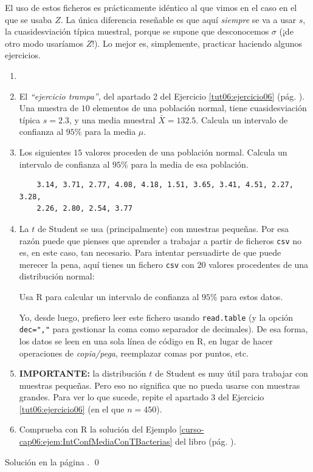 \documentclass[10pt,a4paper]{article}\usepackage[]{graphicx}\usepackage[]{color}
\begin{document}
El uso de estos ficheros es prácticamente idéntico al que vimos en el caso en el que se usaba $Z$. La  única diferencia reseñable es que aquí {\em siempre} se va a usar $s$, la cuasidesviación típica muestral, porque se supone que desconocemos $\sigma$ (¡de otro modo usaríamos $Z$!). Lo mejor es, simplemente, practicar haciendo algunos ejercicios.

\begin{ejercicio}
\label{tut06:ejercicio14}
\begin{enumerate}
  \item[]
  \item El {\em ``ejercicio trampa''}, del apartado 2 del Ejercicio \ref{tut06:ejercicio06} (pág. \pageref{tut06:ejercicio06}). Una muestra de $10$ elementos de una población normal, tiene cuasidesviación típica $s=2.3$, y una media muestral $\bar X=132.5$. Calcula un intervalo  de confianza al $95\%$ para la media $\mu$.

  \item Los siguientes $15$ valores proceden de una población normal. Calcula un intervalo de confianza al $95\%$ para la media de esa población.
    \begin{verbatim}
    3.14, 3.71, 2.77, 4.08, 4.18, 1.51, 3.65, 3.41, 4.51, 2.27, 3.28,
    2.26, 2.80, 2.54, 3.77
    \end{verbatim}

  \item La $t$ de Student se usa (principalmente) con muestras pequeñas. Por esa razón puede que pienses que aprender a trabajar a partir de ficheros {\tt csv} no es, en este caso, tan necesario.  Para intentar persuadirte de que puede merecer la pena, aquí tienes un fichero {\tt csv} con $20$ valores procedentes de una distribución normal:
      \begin{center}
      \end{center}
      Usa R para calcular un intervalo de confianza al $95\%$ para estos datos.

Yo, desde luego, prefiero leer este fichero usando {\tt read.table} (y la opción \verb/dec=","/ para gestionar la coma como separador de decimales). De esa forma, los datos se leen en una sola línea de código en R, en lugar de hacer operaciones de {\em copia/pega}, reemplazar comas por puntos, etc.

  \item {\bf IMPORTANTE:} la distribución $t$ de Student es muy útil para trabajar con muestras pequeñas. Pero eso no significa que no pueda usarse con muestras grandes. Para ver lo que sucede, repite el apartado 3 del Ejercicio \ref{tut06:ejercicio06} (en el que $n=450$).

  \item Comprueba con R la solución del Ejemplo \ref{curso-cap06:ejem:IntConfMediaConTBacterias} del libro (pág. \pageref{curso-cap06:ejem:IntConfMediaConTBacterias}).

\end{enumerate}
Solución en la página \pageref{tut06:ejercicio14:sol}.
\qed
\end{ejercicio}
\end{document}
